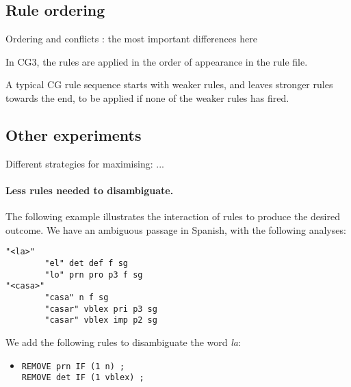 \documentclass[11pt]{article}
\begin{document}
\subsection{Rule ordering}
\label{ssec:ordering}

Ordering and conflicts : the most important differences here



In CG3, the rules are applied in the order of appearance in the rule file.

A typical CG rule sequence starts with weaker rules, and leaves stronger rules towards the end, 
to be applied if none of the weaker rules has fired.

\subsection{Other experiments}

Different strategies for maximising: ...

\paragraph{Less rules needed to disambiguate.}
The following example illustrates the interaction of rules to produce the desired outcome. We have an ambiguous passage in Spanish, with the following analyses:

\begin{verbatim}
"<la>"
        "el" det def f sg
        "lo" prn pro p3 f sg
"<casa>"
        "casa" n f sg
        "casar" vblex pri p3 sg
        "casar" vblex imp p2 sg
\end{verbatim}

We add the following rules to disambiguate the word \emph{la}:
\begin{itemize}
\item [] \texttt{REMOVE prn IF (1 n) ;} \\
             \texttt{REMOVE det IF (1 vblex) ;}
\end{itemize}
\end{document}

